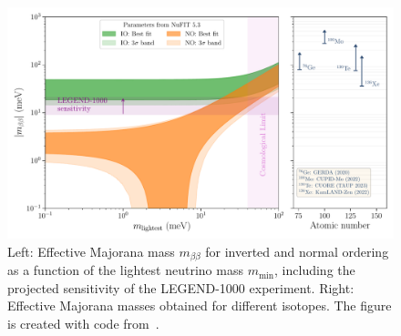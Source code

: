 \begin{figure}
    \centering
    \includegraphics[width=1\linewidth]{figures/02_neutrino/Lobster_plot_NuFIT_5-2.pdf}
    \caption{Left: Effective Majorana mass $m_{\beta \beta}$ for inverted and normal ordering as a function of the lightest neutrino mass $m_\mathrm{min}$, including the projected sensitivity of the LEGEND-1000 experiment. Right: Effective Majorana masses obtained for different isotopes. The figure is created with code from~\cite{torres_toej93lobsterplot_2024}.}
    \label{fig:Lobster_2024}
\end{figure}
